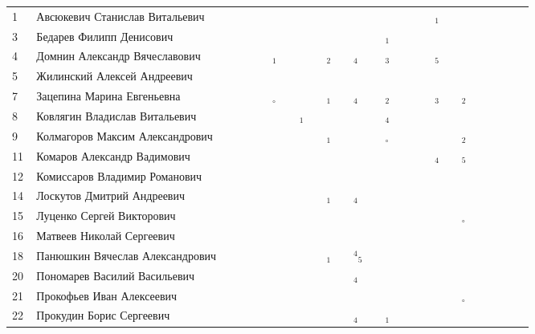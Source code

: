 \documentclass[a4paper,11pt]{article}
\newcommand*\Ok{&\small \ding{51}$\!\!_\circ$} %
\newcommand*\ok{&{\small \ding{51}}} %
\newcommand*\no{&{\small }} %
\newcommand*\da{&{\small\ding{48}$\!\!_1$}} %
\newcommand*\db{&{\small\ding{48}$\!\!_2$}} %
\newcommand*\dc{&{\small\ding{48}$\!\!_3$}} %
\newcommand*\dd{&{\small\ding{48}$\!\!_4$}} %
\newcommand*\de{&{\small\ding{48}$\!\!_5$}} %
\newcommand*\dE{&{\small${}^4\!\!\!$\ding{48}$\!\!_5$}} %
\begin{document}
\begin{tabular}{p{7pt}|l|p{6pt}p{6pt}p{6pt}p{6pt}p{6pt}p{6pt}p{6pt}p{6pt}p{6pt}p{6pt}p{6pt}p{6pt}p{6pt}p{6pt}p{6pt}p{6pt}p{6pt}p{6pt}p{6pt}p{6pt}p{6pt}p{6pt}p{6pt}p{6pt}}
\\
\midrule
 1\,&Авсюкевич Станислав Витальевич	\ok\ok\ok\ok\ok\ok\ok\ok\ok\ok\ok\ok\ok\ok\ok\ok\da\ok\ok\\
 3\,&Бедарев Филипп Денисович		\ok\ok\ok\ok\ok\ok\ok\ok\ok\ok\no\ok\da\ok\ok\ok\no\no\ok\\
 4\,&Домнин Александр Вячеславович	\ok\ok\ok\ok\da\ok\ok\ok\db\ok\dd\ok\dc\ok\no\no\de\ok\ok\\
 5\,&Жилинский Алексей Андреевич	\ok\ok\ok\ok\ok\ok\ok\ok\ok\ok\ok\ok\ok\ok\ok\ok\no\ok\no\\
 7\,&Зацепина Марина Евгеньевна		\no\ok\ok\ok\Ok\ok\ok\ok\da\ok\dd\ok\db\ok\ok\ok\dc\ok\db\\
 8\,&Ковлягин Владислав Витальевич	\ok\ok\ok\ok\ok\ok\da\ok\ok\ok\ok\ok\dd\ok\ok\ok\ok\ok\ok\\
 9\,&Колмагоров Максим Александрович	\ok\ok\ok\ok\ok\ok\ok\ok\da\ok\ok\ok\Ok\ok\ok\ok\ok\ok\db\\
\midrule
11\,&Комаров Александр Вадимович	\ok\ok\ok\no\ok\ok\ok\ok\ok\ok\ok\ok\ok\ok\ok\ok\dd\ok\de\\
12\,&Комиссаров Владимир Романович	\ok\ok\ok\ok\ok\ok\ok\ok\ok\ok\ok\ok\ok\ok\ok\ok\ok\ok\ok\\
14\,&Лоскутов Дмитрий Андреевич		\ok\ok\ok\ok\ok\ok\ok\ok\da\ok\dd\ok\ok\ok\ok\ok\ok\ok\ok\\
15\,&Луценко Сергей Викторович		\ok\ok\ok\ok\ok\ok\ok\ok\ok\ok\ok\ok\ok\ok\no\no\ok\ok\Ok\\
16\,&Матвеев Николай Сергеевич		\ok\ok\no\ok\ok\ok\no\ok\no\ok\no\ok\\
18\,&Панюшкин Вячеслав Александрович	\ok\ok\ok\ok\ok\ok\no\ok\da\ok\dE\ok\no\ok\no\ok\no\ok\ok\\
\midrule
20\,&Пономарев Василий Васильевич	\ok\ok\ok\ok\ok\no\ok\ok\no\ok\dd\ok\no\ok\no\ok\no\ok\no\\
21\,&Прокофьев Иван Алексеевич		\ok\ok\ok\ok\ok\no\ok\ok\ok\ok\ok\ok\ok\no\ok\no\no\no\Ok\\ 
22\,&Прокудин Борис Сергеевич		\ok\ok\ok\ok\ok\ok\ok\ok\ok\ok\dd\ok\da\ok\ok\ok\ok\ok\ok\\

\end{tabular}
\end{document}
